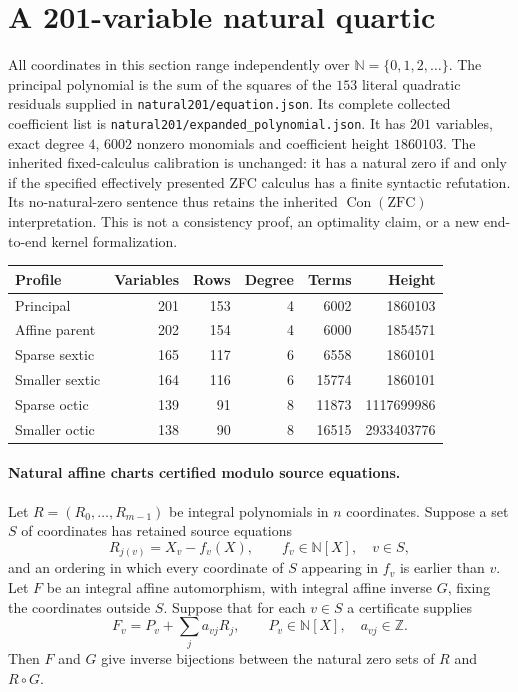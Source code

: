 \section{A 201-variable natural quartic}

All coordinates in this section range independently over
$\mathbb N=\{0,1,2,\ldots\}$. The principal polynomial is the sum of the
squares of the $153$ literal quadratic residuals supplied in
\texttt{natural201/equation.json}. Its complete collected coefficient list is
\texttt{natural201/expanded\_polynomial.json}. It has $201$ variables, exact
degree $4$, $6002$ nonzero monomials and coefficient height $1860103$.
The inherited fixed-calculus calibration is unchanged: it has a natural zero
if and only if the specified effectively presented ZFC calculus has a finite
syntactic refutation. Its no-natural-zero sentence thus retains the inherited
$\operatorname{Con}(\mathrm{ZFC})$ interpretation. This is not a consistency
proof, an optimality claim, or a new end-to-end kernel formalization.

\begin{center}
\begin{tabular}{lrrrrr}
Profile & Variables & Rows & Degree & Terms & Height\\\hline
Principal &201&153&4&6002&1860103\\
Affine parent &202&154&4&6000&1854571\\
Sparse sextic &165&117&6&6558&1860101\\
Smaller sextic &164&116&6&15774&1860101\\
Sparse octic &139&91&8&11873&1117699986\\
Smaller octic &138&90&8&16515&2933403776
\end{tabular}
\end{center}

\paragraph{Natural affine charts certified modulo source equations.}
Let $R=(R_0,\ldots,R_{m-1})$ be integral polynomials in $n$ coordinates.
Suppose a set $S$ of coordinates has retained source equations
\[
 R_{j(v)}=X_v-f_v(X),\qquad f_v\in\mathbb N[X],\quad v\in S,
\]
and an ordering in which every coordinate of $S$ appearing in $f_v$ is
earlier than $v$. Let $F$ be an integral affine automorphism, with integral
affine inverse $G$, fixing the coordinates outside $S$. Suppose that for each
$v\in S$ a certificate supplies
\[
 F_v=P_v+\sum_j a_{vj}R_j,\qquad P_v\in\mathbb N[X],\quad a_{vj}\in\mathbb Z.
 \tag{N1}
\]
Then $F$ and $G$ give inverse bijections between the natural zero sets of
$R$ and $R\circ G$.


